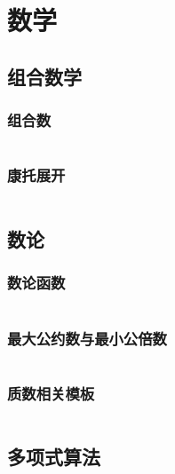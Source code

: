 \chapter{数学}

\section{组合数学}

\subsection{组合数}

\inputminted{cpp}{code/Math/Comb/C(n,m).cpp}

\subsection{康托展开}

\inputminted{cpp}{code/Math/Comb/CanTor.cpp}

\section{数论}

\subsection{数论函数}

\inputminted{cpp}{code/Math/NumberTheory/ArithmeticFunctions.cpp}

\subsection{最大公约数与最小公倍数}

\inputminted{cpp}{code/Math/NumberTheory/GcdAndLcm.cpp}

\subsection{质数相关模板}

\inputminted{cpp}{code/Math/NumberTheory/Prime.cpp}

\section{多项式算法}

\inputminted{cpp}{code/Math/Polynomial/Polynomial.cpp}

